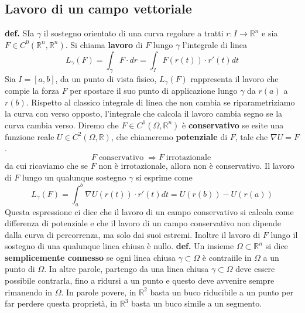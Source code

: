 \subsection*{Lavoro di un campo vettoriale}
\textbf{def.} SIa $\gamma$ il sostegno orientato di una curva regolare a tratti $r: I \rightarrow \mathbb{R}^n$ e sia $F \in C ^0(\mathbb{R}^n, \mathbb{R}^n)$. Si chiama \textbf{lavoro} di $F$ lungo $\gamma$ l'integrale di linea
\[
    L_\gamma (F) = \int_{\gamma} F \cdot dr = \int_{I} F(r(t))\cdot r'(t) dt
\]
Sia $I = [a,b]$, da un punto di vista fisico, $L_\gamma(F)$ rappresenta il lavoro che compie la forza $F$ per spostare il suo punto di applicazione lungo $\gamma$ da $r(a)$ a $r(b)$.\newline
Rispetto al classico integrale di linea che non cambia se riparametriziamo la curva con verso opposto, l'integrale che calcola il lavoro cambia segno se la curva cambia verso.\newline
\newline
Diremo che $F \in C^1(\Omega, \mathbb{R}^n)$ è \textbf{conservativo} se esite una funzione reale $U \in C^2(\Omega, \mathbb{R})$, che chiameremo \textbf{potenziale} di $F$, tale che $\nabla U = F$.\newline
\newline
\[
    F \; \text{conservativo}\; \Longrightarrow F \; \text{irrotazionale}\;
\]
da cui ricaviamo che se $F$ non è irrotazionale, allora non è conservativo.\newline
\newline
Il lavoro di $F$ lungo un qualunque sostegno $\gamma$ si esprime come
\[
    L_\gamma(F) = \int_{a}^{b}\nabla U(r(t)) \cdot r'(t) dt = U(r(b)) - U(r(a))
\]
Questa espressione ci dice che il lavoro di un campo conservativo si calcola come differenza di potenziale e che il lavoro di un campo conservativo non dipende dalla curva di percorrenza, ma solo dai suoi estremi. Inoltre il lavoro di $F$ lungo il sostegno di una qualunque linea chiusa è nullo.\newline
\newline
\textbf{def.} Un insieme $\Omega \subset \mathbb{R}^n$ si dice \textbf{semplicemente connesso} se ogni linea chiusa $\gamma \subset \Omega$ è contraiile in $\Omega$ a un punto di $\Omega$. In altre parole, partengo da una linea chiusa $\gamma \subset \Omega$ deve essere possibile contrarla, fino a ridursi a un punto e questo deve avvenire sempre rimanendo in $\Omega$.\newline
In parole povere, in $\mathbb{R}^2$ basta un buco riducibile a un punto per far perdere questa proprietà, in $\mathbb{R}^3$ basta un buco simile a un segmento.\newline

